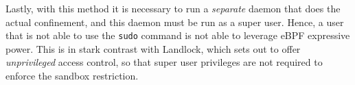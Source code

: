 Lastly, with this method it is necessary to run a \textit{separate} daemon that does the actual
confinement, and this daemon must be run as a super user.
Hence, a user that is not able to use the \texttt{sudo} command is not able to leverage eBPF
expressive power.
This is in stark contrast with Landlock, which sets out to offer \textit{unprivileged} access control,
so that super user privileges are not required to enforce the sandbox restriction.